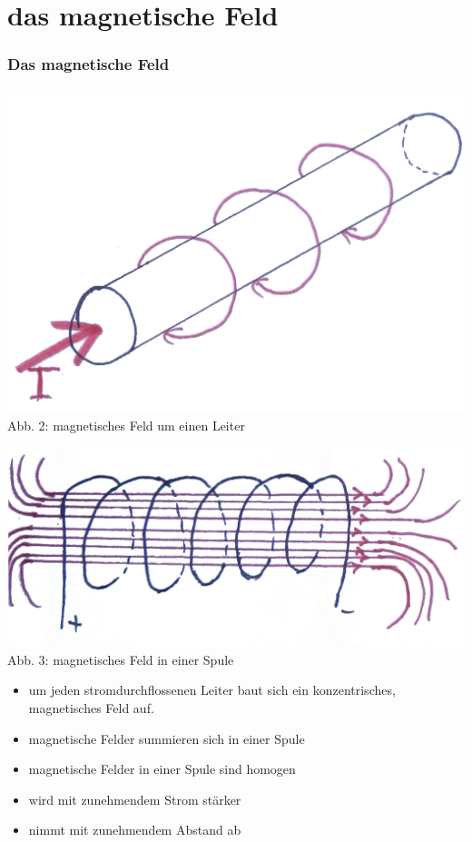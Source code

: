 \section*{das magnetische Feld}
\begin{frame}
\frametitle{Das magnetische Feld}
\begin{center}
	\begin{minipage}{0.4\textwidth}
	\includegraphics[scale=0.35]{e08/magfeld1.png}\\
	\small{Abb. 2: magnetisches Feld um einen Leiter}
	\end{minipage}
	\begin{minipage}{0.4\textwidth}
	\includegraphics[scale=0.4]{e08/magfeld2.png}\\
	\small{Abb. 3: magnetisches Feld in einer Spule}
	\end{minipage}
	\vspace{0.5cm}
	\begin{itemize}
		\item um jeden stromdurchflossenen Leiter baut sich ein konzentrisches, magnetisches Feld auf.
		\item magnetische Felder summieren sich in einer Spule
		\item magnetische Felder in einer Spule sind homogen
		\item wird mit zunehmendem Strom stärker
		\item nimmt mit zunehmendem Abstand ab
	\end{itemize}
\end{center}
\end{frame}

